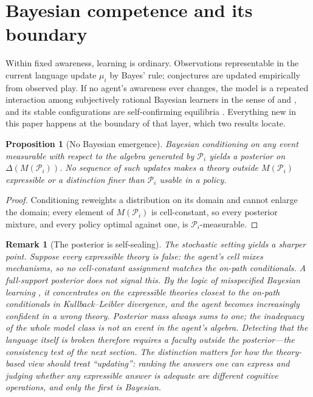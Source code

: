 \documentclass[11pt]{article}
\newtheorem{proposition}[assumption]{Proposition}
\newtheorem{remark}[assumption]{Remark}
\theoremstyle{definition}
\begin{document}
\section{Bayesian competence and its boundary}
\label{sec:bayesian}

Within fixed awareness, learning is ordinary.  Observations representable in
the current language update $\mu_i$ by Bayes' rule; conjectures are updated
empirically from observed play.  If no agent's awareness ever changes, the
model is a repeated interaction among subjectively rational Bayesian
learners in the sense of \citet{KalaiLehrer1993b} and \citet{Ryall2003}, and
its stable configurations are self-confirming equilibria
\citep{FudenbergLevine1993}.  Everything new in this paper happens at the
boundary of that layer, which two results locate.

\begin{proposition}[No Bayesian emergence]
\label{prop:no-emergence}
Bayesian conditioning on any event measurable with respect to the algebra
generated by $\mathcal P_i$ yields a posterior on $\Delta(M(\mathcal P_i))$.
No sequence of such updates makes a theory outside $M(\mathcal P_i)$
expressible or a distinction finer than $\mathcal P_i$ usable in a policy.
\end{proposition}

\begin{proof}
Conditioning reweights a distribution on its domain and cannot enlarge the
domain; every element of $M(\mathcal P_i)$ is cell-constant, so every
posterior mixture, and every policy optimal against one, is
$\mathcal P_i$-measurable.
\end{proof}

\begin{remark}[The posterior is self-sealing]
\label{rem:self-sealing}
The stochastic setting yields a sharper point.  Suppose every expressible
theory is false: the agent's cell mixes mechanisms, so no cell-constant
assignment matches the on-path conditionals.  A full-support posterior does
not signal this.  By the logic of misspecified Bayesian learning
\citep{Berk1966}, it concentrates on the expressible theories closest to the
on-path conditionals in Kullback--Leibler divergence, and the agent becomes
increasingly \emph{confident} in a wrong theory.  Posterior mass always sums
to one; the inadequacy of the whole model class is not an event in the
agent's algebra.  Detecting that the language itself is broken therefore
requires a faculty outside the posterior---the consistency test of the next
section.  The distinction matters for how the theory-based view should treat
``updating'': ranking the answers one can express and judging whether any
expressible answer is adequate are different cognitive operations, and only
the first is Bayesian.
\end{remark}
\end{document}
